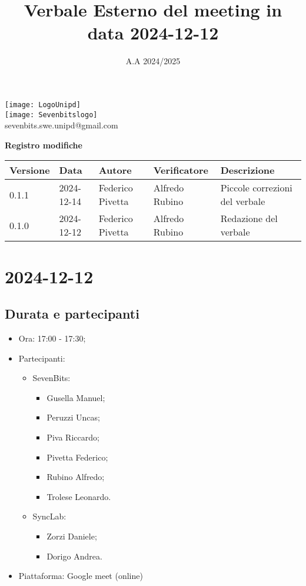 \documentclass[10pt]{article}
\title{Verbale Esterno del meeting in data 2024-12-12}
\date{A.A 2024/2025}
\begin{document}
\maketitle
\begin{center}
\texttt{[image: LogoUnipd]}\\
\texttt{[image: Sevenbitslogo]}\\
sevenbits.swe.unipd@gmail.com\\
\vspace{2mm}

\textbf{Registro modifiche}\\
\vspace{2mm}
\begin{tabularx}{\textwidth}{|l|l|l|l|X|}
\hline
\textbf{Versione} & \textbf{Data} & \textbf{Autore} & \textbf{Verificatore} & \textbf{Descrizione} \\
\hline
0.1.1 & 2024-12-14 & Federico Pivetta & Alfredo Rubino & Piccole correzioni del verbale\\
\hline
0.1.0 & 2024-12-12 & Federico Pivetta & Alfredo Rubino & Redazione del verbale\\
\hline
\end{tabularx}
\end{center}

\newpage
\tableofcontents

\newpage
\section{2024-12-12}
\subsection{Durata e partecipanti}
\begin{itemize}
\item Ora: 17:00 - 17:30;
\item Partecipanti: 	
	\begin{itemize}
            \item SevenBits:
            \begin{itemize}
	              \item Gusella Manuel;
                    \item Peruzzi Uncas;
                    \item Piva Riccardo;
                    \item Pivetta Federico;
                    \item Rubino Alfredo;
                    \item Trolese Leonardo.
	    \end{itemize}
            \item SyncLab:
            \begin{itemize}
                \item Zorzi Daniele;
                \item Dorigo Andrea.
            \end{itemize}
        \end{itemize}
\item Piattaforma: Google meet (online)
\end{itemize}
\end{document}
